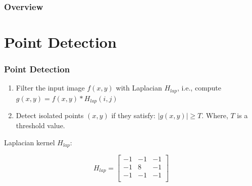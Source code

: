 \documentclass[english,11pt,table,handout]{beamer}
\date{09 September 2015}
\begin{document}
\begin{frame}
  \maketitle
\end{frame}

\begin{frame}\frametitle<presentation>{Overview}
  \tableofcontents
\end{frame}


\section{Point Detection}
\frame
{
	\frametitle{Point Detection}
	\begin{enumerate}
		\item Filter the input image $f(x,y)$ with Laplacian $H_{lap}$, i.e., compute $g(x,y) = f(x,y)*H_{lap}(i,j)$
		\item Detect isolated points $(x,y)$ if they satisfy: $|g(x,y)| \ge T$. Where, $T$ is a threshold value.
	\end{enumerate}
	
	Laplacian kernel $H_{lap}$:
	
	\centering
	$$
	H_{lap} = \left[
	\begin{array}{rrr}
		-1 & -1 & -1 \\ 
		-1 & 8 & -1 \\
		-1 & -1 & -1 \\
	\end{array}
	\right]
	$$

}
\end{document}

